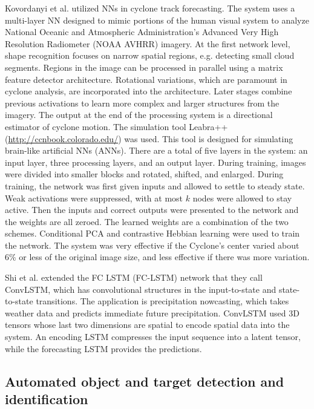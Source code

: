 \documentclass[12pt]{spieman}
\begin{document}
\begin{spacing}{1}
Kovordanyi et al. \cite{kovordanyi2009cyclone} utilized NNs in cyclone track forecasting. The system uses a multi-layer NN designed to mimic portions of the human visual system to analyze National Oceanic and Atmospheric Administration's Advanced Very High Resolution Radiometer (NOAA AVHRR) imagery. At the first network level, shape recognition focuses on narrow spatial regions, e.g. detecting small cloud segments. Regions in the image can be processed in parallel using a matrix feature detector architecture. Rotational variations, which are paramount in cyclone analysis, are incorporated into the architecture. Later stages combine previous activations to learn more complex and larger structures from the imagery. The output at the end of the processing system is a directional estimator of cyclone motion. The simulation tool Leabra++ (\url{http://ccnbook.colorado.edu/}) was used. This tool is designed for simulating brain-like artificial NNs (ANNs). There are a total of five layers in the system: an input layer, three processing layers, and an output layer. During training, images were divided into smaller blocks and rotated, shifted, and enlarged. During training, the network was first given inputs and allowed to settle to steady state. Weak activations were suppressed, with at most $k$ nodes were allowed to stay active. Then the inputs and correct outputs were presented to the network and the weights are all zeroed. The learned weights are a combination of the two schemes. Conditional PCA and contrastive Hebbian learning were used to train the network. The system was very effective if the Cyclone's center varied about 6\% or less of the original image size, and less effective if there was more variation.

Shi et al. \cite{Shi2015Convolutional} extended the FC LSTM (FC-LSTM) network that they call ConvLSTM, which has convolutional structures in the input-to-state and state-to-state transitions. The application is precipitation nowcasting, which takes weather data and predicts immediate future precipitation. ConvLSTM used 3D tensors whose last two dimensions are spatial to encode spatial data into the system. An encoding LSTM compresses the input sequence into a latent tensor, while the forecasting LSTM provides the predictions.

\subsection{Automated object and target detection and identification}


\end{spacing}
\end{document}
